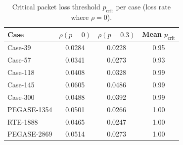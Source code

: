 \begin{table}[t]
\centering
\caption{Critical packet loss threshold $p_{\text{crit}}$ per case (loss rate where $\rho = 0$).}
\label{tab:sweep}
\begin{tabular}{lccc}
\toprule
Case & $\rho(p{=}0)$ & $\rho(p{=}0.3)$ & Mean $p_{\text{crit}}$ \\
\midrule
Case-39 & 0.0284 & 0.0228 & 0.95 \\
Case-57 & 0.0341 & 0.0273 & 0.93 \\
Case-118 & 0.0408 & 0.0328 & 0.99 \\
Case-145 & 0.0605 & 0.0486 & 0.99 \\
Case-300 & 0.0488 & 0.0392 & 0.99 \\
PEGASE-1354 & 0.0501 & 0.0266 & 1.00 \\
RTE-1888 & 0.0465 & 0.0247 & 1.00 \\
PEGASE-2869 & 0.0514 & 0.0273 & 1.00 \\
\bottomrule
\end{tabular}
\end{table}